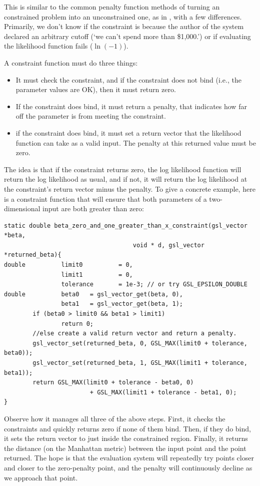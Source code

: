 This is similar to the common penalty function methods of turning an
constrained problem into an unconstrained one, as in \cite{avriel:nonlinear},
with a few differences. Primarily, we don't know if the constraint is
because the author of the system declared an arbitrary cutoff (`we can't spend more
than \$1,000.') or if evaluating the likelihood function fails
($\ln(-1)$). 

A constraint function must do three things:
\begin{itemize}
\item It must check the constraint, and if the constraint does not bind (i.e., the parameter values are OK), then it must return zero.
\item If the constraint does bind, it must return a penalty, that indicates how far off the parameter is from meeting the constraint.
\item if the constraint does bind, it must set a return vector that the likelihood function can take as a valid input. The penalty at this returned value must be zero.
\end{itemize}

The idea is that if the constraint returns zero, the log likelihood
function will return the log likelihood as usual, and if not, it will
return the log likelihood at the constraint's return vector minus the
penalty. To give a concrete example, here is a constraint function that
will ensure that both parameters of a two-dimensional input are both
greater than zero:

\begin{lstlisting}
static double beta_zero_and_one_greater_than_x_constraint(gsl_vector *beta, 
                                    void * d, gsl_vector *returned_beta){
double          limit0          = 0,
                limit1          = 0,
                tolerance       = 1e-3; // or try GSL_EPSILON_DOUBLE
double          beta0   = gsl_vector_get(beta, 0),
                beta1   = gsl_vector_get(beta, 1);
        if (beta0 > limit0 && beta1 > limit1)
                return 0;
        //else create a valid return vector and return a penalty.
        gsl_vector_set(returned_beta, 0, GSL_MAX(limit0 + tolerance, beta0)); 
        gsl_vector_set(returned_beta, 1, GSL_MAX(limit1 + tolerance, beta1));
        return GSL_MAX(limit0 + tolerance - beta0, 0) 
                        + GSL_MAX(limit1 + tolerance - beta1, 0); 
}
\end{lstlisting}

Observe how it manages all three of the above steps. First, it checks
the constraints and quickly returns zero if none of them bind. Then, if
they do bind, it sets the return vector to just inside the constrained
region. Finally, it returns the distance (on the Manhattan metric)
between the input point and the point returned. The hope is that the
evaluation system will repeatedly try points closer and closer to the
zero-penalty point, and the penalty will continuously decline as we
approach that point.

